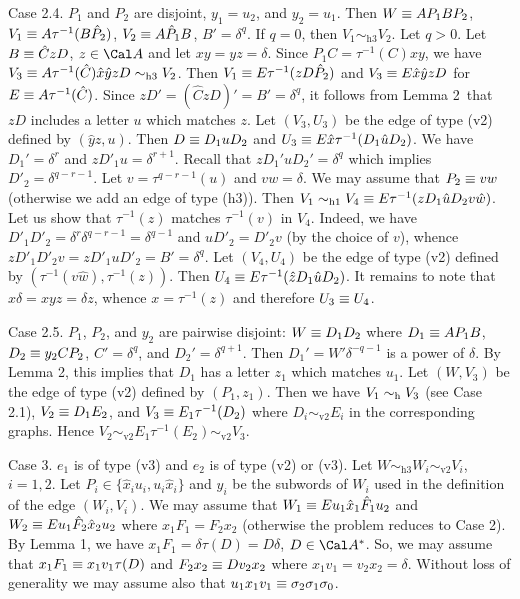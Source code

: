 Case 2.4. $P_1$ and $P_2$ are disjoint, $y_1=u_2$, and $y_2=u_1$. Then
$W\equiv A P_1 B P_2$, $V_1\equiv A \tau^{-1}(B \hat P_2)$,
$V_2\equiv A\hat P_1 B$, $B'=\delta^q$. If $q=0$, then
$V_1\sim_{\text{h3}}V_2$. Let $q>0$. Let
$B\equiv\hat CzD$, $z\in\Cal A$ and
let $xy=yz=\delta$.
Since $P_1C=\tau^{-1}(C)xy$, we have
$V_3\equiv A\tau^{-1}(\hat C)\hat x\hat y z D\sim_{\text{h3}}V_2$.
Then $V_1\equiv E\tau^{-1}(zD \hat P_2)$ and
$V_3\equiv E\hat x\hat y z D$ for $E\equiv A\tau^{-1}(\hat C)$.
Since $zD'=(\hat CzD)'=B'=\delta^q$, it follows from Lemma 2\ that
$zD$ includes a letter
$u$ which matches $z$. Let $(V_3,U_3)$ 
be the edge of type (v2) defined by $(\hat y z,u)$.
Then $D\equiv D_1uD_2$ and $U_3\equiv E\hat x\tau^{-1}(D_1\hat u D_2)$. 
We have $D_1'=\delta^r$ and $zD'_1u=\delta^{r+1}$.
Recall that $zD_1'uD_2'=\delta^q$ which implies $D'_2=\delta^{q-r-1}$.
Let $v=\tau^{q-r-1}(u)$ and $vw=\delta$.
We may assume that $P_2\equiv vw$ (otherwise we add an edge of type (h3)).
Then $V_1\sim_{\text{h1}}V_4\equiv E\tau^{-1}(zD_1\hat u D_2 v\hat w)$.
Let us show that $\tau^{-1}(z)$ matches
$\tau^{-1}(v)$ in $V_4$. Indeed, we have
$D'_1D'_2=\delta^r\delta^{q-r-1}=\delta^{q-1}$ and $uD'_2=D'_2v$ (by the choice of $v$),
whence $zD'_1 D'_2v=zD'_1uD'_2=B'=\delta^q$.
Let $(V_4,U_4)$ be the edge of type (v2) defined by
$(\tau^{-1}(v\hat w),\tau^{-1}(z))$. Then
$U_4\equiv E\tau^{-1}(\hat zD_1\hat uD_2)$. It remains to note that
$x\delta=xyz=\delta z$, whence $x=\tau^{-1}(z)$ and therefore $U_3\equiv U_4$.

Case 2.5. $P_1$, $P_2$, and $y_2$ are pairwise disjoint:
$W\equiv D_1 D_2$ where $D_1\equiv A P_1 B$,
$D_2\equiv y_2 C P_2$,
$C'=\delta^q$, and $D_2'=\delta^{q+1}$.
Then $D_1'=W'\delta^{-q-1}$ is a power of $\delta$. By
Lemma 2, this implies that $D_1$ has a letter $z_1$ which matches $u_1$.
Let $(W,V_3)$ be the edge of type (v2) defined by $(P_1,z_1)$.
Then we have $V_1\sim_{\text{h}} V_3$ (see Case 2.1),
$V_2\equiv D_1 E_2$, and $V_3\equiv E_1\tau^{-1}(D_2)$ where
$D_i\sim_{\text{v2}}E_i$ in the corresponding graphs.
Hence $V_2\sim_{\text{v2}} E_1\tau^{-1}(E_2)\sim_{\text{v2}} V_3$.


Case 3. $e_1$ is of type (v3) and $e_2$ is of type (v2) or (v3).
Let $W\sim_{\text{h3}}W_i\sim_{\text{v2}}V_i$, $i=1,2$.
Let $P_i\in\{\hat x_i u_i,u_i\hat x_i\}$ and $y_i$ be the subwords of $W_i$
used in the definition of the edge $(W_i,V_i)$.
We may assume that
$W_1\equiv Eu_1\hat x_1\hat F_1 u_2$ and
$W_2\equiv Eu_1\hat F_2\hat x_2 u_2$ where $x_1 F_1=F_2 x_2$
(otherwise the problem reduces to Case 2). By Lemma 1, we have
$x_1F_1=\delta\tau(D)=D\delta$, $D\in\Cal A^*$.
So, we may assume that
$x_1 F_1\equiv x_1v_1\tau(D)$ and $F_2 x_2\equiv D v_2 x_2$ where
$x_1 v_1=v_2 x_2=\delta$. Without loss of generality we may assume also that
$u_1x_1v_1\equiv\sigma_2\sigma_1\sigma_0$.


